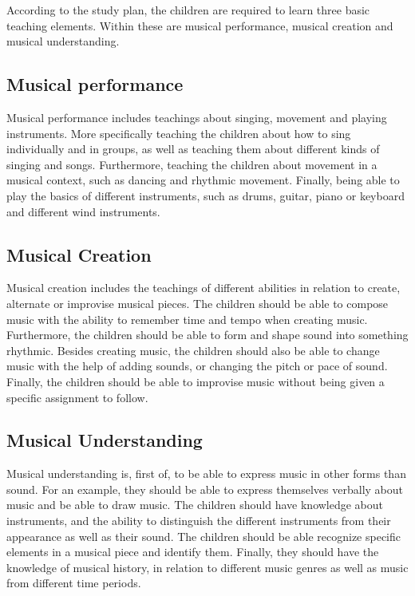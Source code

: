 According to the study plan, the children are required to learn three basic teaching elements. Within these are musical performance, musical creation and musical understanding.

\subsection*{Musical performance}
Musical performance includes teachings about singing, movement and playing instruments. More specifically teaching the children about how to sing individually and in groups, as well as teaching them about different kinds of singing and songs. Furthermore, teaching the children about movement in a musical context, such as dancing and rhythmic movement. Finally, being able to play the basics of different instruments, such as drums, guitar, piano or keyboard and different wind instruments.

\subsection*{Musical Creation}
Musical creation includes the teachings of different abilities in relation to create, alternate or improvise musical pieces. The children should be able to compose music with the ability to remember time and tempo when creating music. Furthermore, the children should be able to form and shape sound into something rhythmic. Besides creating music, the children should also be able to change music with the help of adding sounds, or changing the pitch or pace of sound. Finally, the children should be able to improvise music without being given a specific assignment to follow.

\subsection*{Musical Understanding}
Musical understanding is, first of, to be able to express music in other forms than sound. For an example, they should be able to express themselves verbally about music and be able to draw music. The children should have knowledge about instruments, and the ability to distinguish the different instruments from their appearance as well as their sound. The children should be able recognize specific elements in a musical piece and identify them. Finally, they should have the knowledge of musical history, in relation to different music genres as well as music from different time periods.
\\

